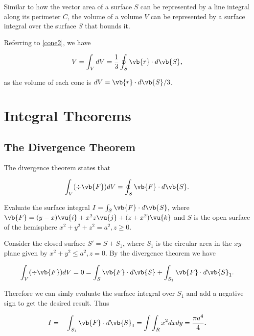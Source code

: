 \documentclass[english,a4paper,12pt]{report}
\begin{document}
Similar to how the vector area of a surface \(S\) can be represented by a line integral along its perimeter \(C\), the volume of a volume \(V\)  can be represented by a surface integral over the surface \(S\) that bounds it.

Referring to \cref{cone2}, we have

\begin{equation}
	V = \int_{V}^{} dV = \frac{1}{3} \oint_{S} \vb{r} \cdot d\vb{S}, 
\end{equation}

as the volume of each cone is \(dV =  \vb{r} \cdot d\vb{S} /3 \). 


\section{Integral Theorems}

\subsection{The Divergence Theorem}
The divergence theorem states that

\begin{equation} \label{divthmm} 
	\int _{V}(\div{\vb{F} } )dV = \oint_{S} \vb{F} \cdot d\vb{S} .
\end{equation}

{Evaluate the surface integral \(I = \int_{S}^{} \vb{F} \cdot d\vb{S}  \), where \(\vb{F} = (y-x)\vu{i} + x^2z \vu{j} + (z+x^2) \vu{k}\) and \(S\) is the open surface of the hemisphere \(x^2 + y^2 + z^2 = a^2, z \ge 0\).}
{Consider the closed surface \(S' = S + S_1 \), where \(S_1 \) is the circular area in the \(xy\)-plane given by \(x^2 + y^2 \le a^2, z=0\). By the divergence theorem we have

\begin{equation}
	\int_{V}^{} (\div{\vb{F} } )dV = 0 = \int_{S}^{} \vb{F} \cdot d\vb{S} + \int_{S_1 }^{} \vb{F} \cdot d\vb{S}_{1} .  
\end{equation}

Therefore we can simly evaluate the surface integral over \(S_1 \) and add a negative sign to get the desired result. Thus

\begin{equation}
	I = - \int_{S_1 }^{} \vb{F} \cdot d\vb{S} _{1} = \int \int_{R}^{} x^2dxdy = \frac{\pi a^4}{4}.   
\end{equation}
} 
\end{document}

